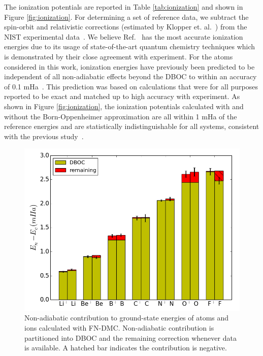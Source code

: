 \documentclass[pra,superscriptaddress,groupedaddress,twocolumn]{revtex4}
\begin{document}
The ionization potentials are reported in Table \ref{tab:ionization} and shown in Figure \ref{fig:ionization}. For determining a set of reference data, we subtract the spin-orbit and relativistic corrections (estimated by Klopper et. al.~\cite{Klopper_IP}) from the NIST experimental data~\cite{NIST_Atoms}. We believe Ref.~\cite{Klopper_IP} has the most accurate ionization energies due to its usage of state-of-the-art quantum chemistry techniques which is demonstrated by their close agreement with experiment.
For the atoms considered in this work, ionization energies have previously been predicted to be independent of all non-adiabatic effects beyond the DBOC to within an accuracy of 0.1 mHa~\cite{Klopper_IP}. This prediction was based on calculations that were for all purposes reported to be exact and matched up to high accuracy with experiment. As shown in Figure \ref{fig:ionization}, the ionization potentials calculated with and without the Born-Oppenheimer approximation are all within 1 mHa of the reference energies and are statistically indistinguishable for all systems, consistent with the previous study~\cite{Klopper_IP}.

\begin{figure}[h]
\includegraphics[scale=.37]{Figures/atom-nad-ad}
\caption{Non-adiabatic contribution to ground-state energies of atoms and ions calculated with FN-DMC. Non-adiabatic contribution is partitioned into DBOC and the remaining correction whenever data is available. A hatched bar indicates the contribution is negative. \label{fig:atom-nad-ad}} %
\end{figure}
\end{document}
